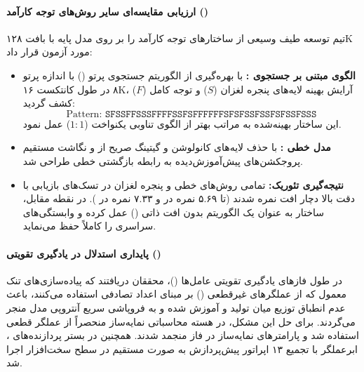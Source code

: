 \paragraph*{ارزیابی مقایسه‌ای سایر روش‌های توجه کارآمد ()}
تیم توسعه  طیف وسیعی از ساختارهای توجه کارآمد را بر روی مدل پایه  با بافت ۱۲۸K مورد آزمون قرار داد:
\begin{itemize}
    \item \textbf{الگوی مبتنی بر جستجوی :} با بهره‌گیری از الگوریتم جستجوی پرتو () با اندازه پرتو ۸ در طول کانتکست ۱۶K، آرایش بهینه لایه‌های پنجره لغزان ($S$) و توجه کامل ($F$) کشف گردید:
    \begin{equation}
        \text{Pattern: } \texttt{SFSSFFSSSFFFFSSFSFFFFFFSFSFSSFSSFSFSSFSSS}
    \end{equation}
    این ساختار بهینه‌شده به مراتب بهتر از الگوی تناوبی یکنواخت ($1:1$) عمل نمود.
    \item \textbf{مدل خطی :} با حذف لایه‌های کانولوشن و گیتینگ صریح از  و نگاشت مستقیم پروجکشن‌های پیش‌آموزش‌دیده به رابطه بازگشتی خطی طراحی شد.
    \item \textbf{نتیجه‌گیری تئوریک:} تمامی روش‌های خطی و پنجره لغزان در تسک‌های بازیابی با دقت بالا دچار افت نمره شدند (تا ۵.۶۹ نمره در  و ۷.۳۳ نمره در ). در نقطه مقابل، ساختار  به عنوان یک الگوریتم بدون افت ذاتی () عمل کرده و وابستگی‌های سراسری را کاملاً حفظ می‌نماید.
\end{itemize}

\paragraph*{پایداری استدلال در یادگیری تقویتی ()}
در طول فازهای یادگیری تقویتی عامل‌ها ()، محققان دریافتند که پیاده‌سازی‌های تنک معمول که از عملگرهای غیرقطعی () بر مبنای اعداد تصادفی استفاده می‌کنند، باعث عدم انطباق توزیع میان تولید و آموزش شده و به فروپاشی سریع آنتروپی مدل منجر می‌گردند. برای حل این مشکل، در هسته محاسباتی نمایه‌ساز  منحصراً از عملگر قطعی  استفاده شد و پارامترهای نمایه‌ساز در فاز  منجمد شدند. همچنین در بستر پردازنده‌های ، ابرعملگر  با تجمیع ۱۳ اپراتور پیش‌پردازش به صورت مستقیم در سطح سخت‌افزار اجرا شد.